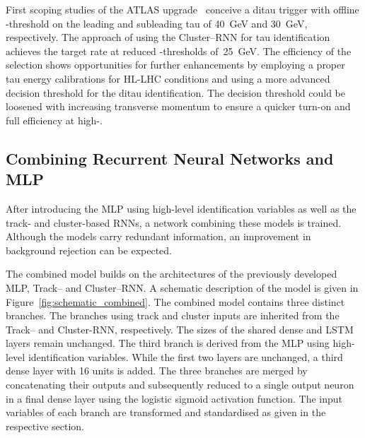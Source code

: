 First scoping studies of the ATLAS upgrade~\cite{phase_2_scoping} conceive a
ditau trigger with offline \tauhadvis \pt-threshold on the leading and
subleading tau of \SI{40}{\GeV} and \SI{30}{\GeV}, respectively. The approach of
using the Cluster--RNN for tau identification achieves the target rate at
reduced \tauhadvis \pt-thresholds of~\SI{25}{\GeV}. The efficiency of the
selection shows opportunities for further enhancements by employing a proper tau
energy calibrations for HL-LHC conditions and using a more advanced decision
threshold for the ditau identification. The decision threshold could be loosened
with increasing transverse momentum to ensure a quicker turn-on and full
efficiency at high-\pt.

\subsection{Combining Recurrent Neural Networks and MLP}
\label{sec:rnn_combined}
After introducing the MLP using high-level identification variables as well as
the track- and cluster-based RNNs, a network combining these models is trained.
Although the models carry redundant information, an improvement in background
rejection can be expected.

The combined model builds on the architectures of the previously developed MLP,
Track-- and Cluster--RNN. A schematic description of the model is given in
Figure~\ref{fig:schematic_combined}. The combined model contains three distinct
branches. The branches using track and cluster inputs are inherited from the
Track-- and Cluster-RNN, respectively. The sizes of the shared dense and LSTM
layers remain unchanged. The third branch is derived from the MLP using
high-level identification variables. While the first two layers are unchanged, a
third dense layer with 16 units is added. The three branches are merged by
concatenating their outputs and subsequently reduced to a single output neuron
in a final dense layer using the logistic sigmoid activation function. The input
variables of each branch are transformed and standardised as given in the
respective section.

